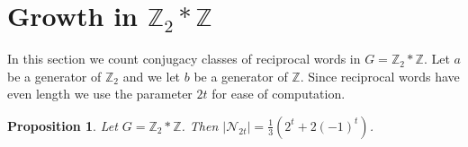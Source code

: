 \documentclass[11pt]{amsart}
\numberwithin{equation}{section}
\theoremstyle{plain}
\newtheorem{prop}[thm]{Proposition}
\begin{document}
\section{Growth in $\mathbb{Z}_2\ast \mathbb{Z}$}
\label{sec: rec. growth based at order infinity}

In this section we count conjugacy classes of reciprocal words in $G = \mathbb{Z}_2\ast \mathbb{Z}$.  Let $a$ be a generator of $\mathbb{Z}_2$ and we let $b$ be a generator of $\mathbb{Z}$. Since reciprocal words have even length we use the parameter $2t$ for  ease of  computation.  


\begin{prop}\label{prop:recurrence}
	Let $G=\mathbb{Z}_2\ast\mathbb{Z}$.  Then  
	$|\mathcal{N}_{2t}|=\frac{1}{3}(2^{t}+2(-1)^{t})$.
\end{prop}
\end{document}
